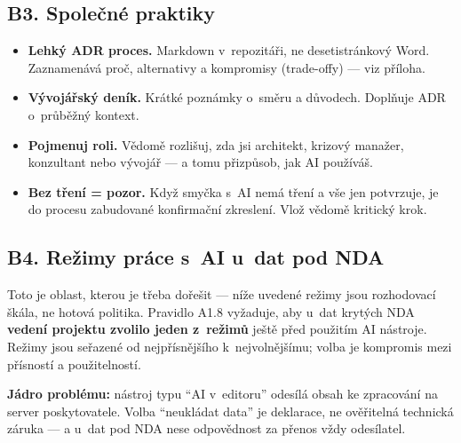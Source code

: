 \subsection{B3. Společné praktiky}

\begin{itemize}
\item \textbf{Lehký ADR proces.}
Markdown v~repozitáři, ne desetistránkový Word.
Zaznamenává proč, alternativy a kompromisy (trade-offy) --- viz příloha.
\item \textbf{Vývojářský deník.}
Krátké poznámky o~směru a důvodech.
Doplňuje ADR o~průběžný kontext.
\item \textbf{Pojmenuj roli.}
Vědomě rozlišuj, zda jsi architekt, krizový manažer, konzultant nebo vývojář --- a tomu přizpůsob, jak AI používáš.
\item \textbf{Bez tření = pozor.}
Když smyčka s~AI nemá tření a vše jen potvrzuje, je do procesu zabudované konfirmační zkreslení.
Vlož vědomě kritický krok.
\end{itemize}

\subsection{B4. Režimy práce s~AI u~dat pod NDA}

Toto je oblast, kterou je třeba dořešit --- níže uvedené režimy jsou rozhodovací škála, ne hotová politika.
Pravidlo A1.8 vyžaduje, aby u~dat krytých NDA \textbf{vedení projektu zvolilo jeden z~režimů} ještě před použitím AI nástroje.
Režimy jsou seřazené od nejpřísnějšího k~nejvolnějšímu; volba je kompromis mezi přísností a použitelností.

\begin{calloutplain}[grey]
\textbf{Jádro problému:} nástroj typu \enquote{AI v~editoru} odesílá obsah ke zpracování na server poskytovatele.
Volba \enquote{neukládat data} je deklarace, ne ověřitelná technická záruka --- a u~dat pod NDA nese odpovědnost za přenos vždy odesílatel.
\end{calloutplain}

